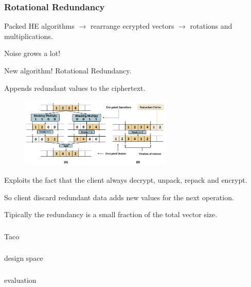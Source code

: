 \documentclass[10pt,handout]{beamer}
\begin{document}


\begin{frame}
\frametitle{Rotational Redundancy}

Packed HE algorithms $\rightarrow$  rearrange ecrypted vectors $\rightarrow$ rotations and multiplications.

Noise grows a lot!

New algorithm! Rotational Redundancy.

Appends redundant values to the ciphertext.
\begin{figure}
    \includegraphics[width=0.65\textwidth]{rotation.png}
\end{figure}

Exploits the fact that the client  always decrypt, unpack, repack and encrypt.

So client discard redundant data adds new values for the next operation.

Tipically the redundancy is a small fraction of the total vector size.
\end{frame}


\begin{frame}
\frametitle{}
Taco
\end{frame}



\begin{frame}
\frametitle{}
design space
\end{frame}



\begin{frame}
\frametitle{}
evaluation
\end{frame}

\end{document}
